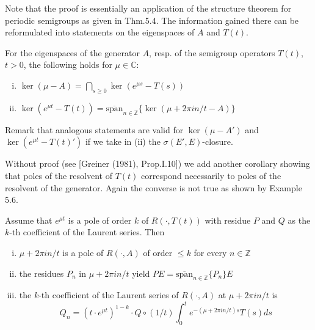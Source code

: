 Note that the proof is essentially an application of the structure theorem for periodic semigroups as given in Thm.5.4.
The information gained there can be reformulated into statements on the eigenspaces of $A$ and $T(t)$.

	

\newpage
\begin{corollary}\label{cor:a3-6.4}
	For the eigenspaces of the generator $A$, resp. of the semigroup operators $T(t)$, $t > 0$, the following holds  for  $\mu \in \mathbb{C}$:
	
	\begin{enumerate}[(i)]
		\item $\ker(\mu - A) = \bigcap_{s \geq 0} \ker(e^{\mu s} - T(s))$
		
		\item $\ker(e^{\mu t} - T(t)) = \overline{\text{span}}_{n \in \mathbb{Z}} \{\ker(\mu + 2\pi i n/t - A)\}$
	\end{enumerate}
\end{corollary}

Remark that analogous statements are valid for $\ker(\mu - A')$ and $\ker(e^{\mu t} - T(t)')$ if we take in (ii) the $\sigma(E',E)$-closure.

Without proof (see [Greiner (1981), Prop.I.10]) we add another corollary showing that poles of the resolvent of $T(t)$ correspond necessarily to poles of the resolvent of the generator.
Again the converse is not true as shown by Example 5.6.

\begin{corollary}\label{cor:a3-6.5}
	Assume that $e^{\mu t}$ is a pole of order $k$ of $R(\cdot,T(t))$ with residue $P$ and $Q$ as the $k$-th coefficient of the Laurent series.
	Then
	
	\begin{enumerate}[(i)]
		\item $\mu + 2\pi i n/t$ is a pole of $R(\cdot,A)$ of order $\leq k$ for every $n \in \mathbb{Z}$
		
		\item the residues $P_{n}$ in $\mu + 2\pi i n/t$ yield $PE = \overline{\text{span}}_{n \in \mathbb{Z}} \{P_{n}\}E$
		
		\item the $k$-th coefficient of the Laurent series of $R(\cdot,A)$ at $\mu + 2\pi i n/t$ is
		\[
		Q_{n} = (t \cdot e^{\mu t})^{1-k} \cdot Q \circ (1/t) \int_{0}^{t} e^{-(\mu+2\pi i n/t)s}T(s) ds
		\]
	\end{enumerate}
\end{corollary}

